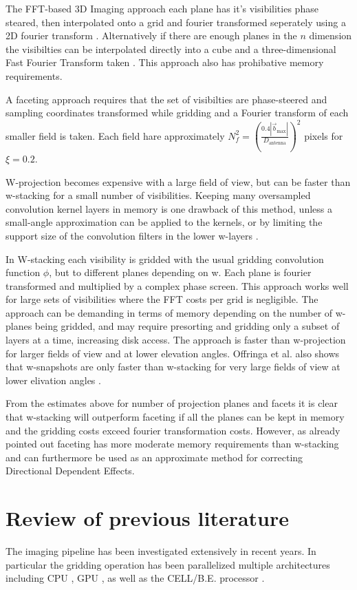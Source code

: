 The FFT-based 3D Imaging approach each plane has it's visibilities phase steared, then interpolated onto a grid and fourier transformed seperately using a 2D fourier transform \cite[Lecture 19]{taylor1999synthesis}. 
Alternatively if there are enough planes in the $n$ dimension the visibilties can be interpolated directly into a cube and a three-dimensional Fast Fourier Transform taken \cite{yashar2009tdp}. This approach also has prohibative memory
requirements.

A faceting approach requires that the set of visibilties are phase-steered and sampling coordinates transformed while gridding and a Fourier transform of each smaller field is taken. Each field hare approximately 
$N_f^2=\left(\frac{0.4|\vec{b}_\text{max}|}{D_\text{antenna}}\right)^2$ pixels for $\xi=0.2$.

W-projection becomes expensive with a large field of view, but can be faster than w-stacking for a small number of visibilities. Keeping many oversampled convolution kernel layers in memory is one drawback
of this method, unless a small-angle approximation can be applied to the kernels, or by limiting the support size of the convolution filters in the lower w-layers \cite{offringa2014wsclean}.

In W-stacking each visibility is gridded with the usual gridding convolution function $\phi$, but to different planes depending on w. Each plane is fourier transformed and 
multiplied by a complex phase screen. This approach works well for large sets of visibilities where the FFT costs per grid is negligible. The approach can be demanding in terms of memory depending
on the number of w-planes being gridded, and may require presorting and gridding only a subset of layers at a time, increasing disk access. The approach is faster than w-projection
for larger fields of view and at lower elevation angles. Offringa et al. also shows that w-snapshots are only faster than w-stacking for very large fields of view at lower elivation angles \cite{offringa2014wsclean}.

From the estimates above for number of projection planes and facets it is clear that w-stacking will outperform faceting if all the planes can be kept in memory and the gridding costs exceed fourier transformation costs. 
However, as already pointed out faceting has more moderate memory requirements than w-stacking and can furthermore be used as an approximate method for correcting Directional Dependent Effects.
\section{Review of previous literature}
The imaging pipeline has been investigated extensively in recent years. In particular the gridding operation has been parallelized multiple architectures including CPU \cite{offringa2014wsclean,golap2015mutithreading,obitfaceting}, 
GPU \cite{humphreys2011analysis,romein2012efficient,muscat2014high,edgar2010enabling}, as well as the CELL/B.E. processor \cite{varbanescu2008performance}. 

